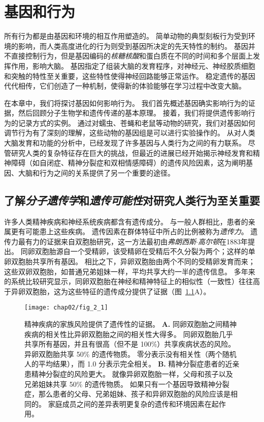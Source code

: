 \chapter{基因和行为} \label{chap:chap2}

所有行为都是由基因和环境的相互作用塑造的。
简单动物的典型刻板行为受到环境的影响，而人类高度进化的行为则受到基因所决定的先天特性的制约。
基因并不直接控制行为，但是基因编码的\textit{核糖核酸}和蛋白质在不同的时间和多个层面上发挥作用，影响大脑。
基因指定了组装大脑的发育程序，对神经元、神经胶质细胞和突触的特性至关重要，这些特性使得神经回路能够正常运作。
稳定遗传的基因代代相传，它们创造了一种机制，使得新的体验能够在学习过程中改变大脑。




在本章中，我们将探讨基因如何影响行为。
我们首先概述基因确实影响行为的证据，然后回顾分子生物学和遗传传递的基本原理。
接着，我们将提供遗传影响行为的记录方式的实例。
通过对蠕虫、苍蝇和老鼠等动物的研究，我们对基因如何调节行为有了深刻的理解，这些动物的基因组是可以进行实验操作的。
从对人类大脑发育和功能的分析中，已经发现了许多基因与人类行为之间的有力联系。
尽管研究人类的复杂特征存在巨大的挑战，但最近的进展已经开始揭示神经发育和精神障碍（如自闭症、精神分裂症和双相情感障碍）的遗传风险因素，这为阐明基因、大脑和行为之间的关系提供了另一个重要的途径。



\section{了解\textit{分子遗传学}和\textit{遗传可能性}对研究人类行为至关重要}

许多人类精神疾病和神经系统疾病都含有遗传成分。
与一般人群相比，患者的亲属更有可能患上这些疾病。
遗传因素在群体特征中所占的比例被称为\textit{遗传力}。
遗传力最有力的证据来自双胞胎研究，这一方法最初由\textit{弗朗西斯$\cdot$高尔顿}在1883年提出。
同卵双胞胎源自一个受精卵，该受精卵在受精后不久分裂为两个；这样的单卵双胞胎共享所有基因。
相比之下，异卵双胞胎由两个不同的受精卵发育而来；这些双卵双胞胎，如普通兄弟姐妹一样，平均共享大约一半的遗传信息。
多年来的系统比较研究显示，同卵双胞胎在神经和精神特征上的相似性（一致性）往往高于异卵双胞胎，这为这些特征的遗传成分提供了证据（图~\ref{fig:2_1}A）。






\begin{figure}[htbp]
	\centering
	\texttt{[image: chap02/fig\_2\_1]}
	\caption{精神疾病的家族风险提供了遗传性的证据。
		\textbf{A.} 同卵双胞胎之间精神疾病的相关性比异卵双胞胎之间的相关性大得多。
		同卵双胞胎几乎共享所有基因，并且有很高（但不是 100\%）共享疾病状态的风险。
		异卵双胞胎共享 50\% 的遗传物质。
		零分表示没有相关性（两个随机人的平均结果），而 1.0 分表示完全相关\cite{mcgue1998genetic}。
		\textbf{B.} 精神分裂症患者的近亲患精神分裂症的风险更大。
		就像异卵双胞胎一样，父母和孩子以及兄弟姐妹共享 50\% 的遗传物质。
		如果只有一个基因导致精神分裂症，那么患者的父母、兄弟姐妹、孩子和异卵双胞胎的风险应该是相同的。 
		家庭成员之间的差异表明更复杂的遗传和环境因素在起作用\cite{gottesman1991schizophrenia}。}
	\label{fig:2_1}
\end{figure}


